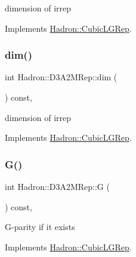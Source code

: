 dimension of irrep 

Implements \mbox{\hyperlink{structHadron_1_1CubicLGRep_a3acbaea26503ed64f20df693a48e4cdd}{Hadron\+::\+Cubic\+L\+G\+Rep}}.

\mbox{\label{structHadron_1_1D3A2MRep_ae911a1abb0e401263bce94ba89ac6142}} 
\subsubsection{\texorpdfstring{dim()}{dim()}\hspace{0.1cm}{\footnotesize\ttfamily [3/3]}}
{\footnotesize\ttfamily int Hadron\+::\+D3\+A2\+M\+Rep\+::dim (\begin{DoxyParamCaption}{ }\end{DoxyParamCaption}) const\hspace{0.3cm}{\ttfamily [inline]}, {\ttfamily [virtual]}}

dimension of irrep 

Implements \mbox{\hyperlink{structHadron_1_1CubicLGRep_a3acbaea26503ed64f20df693a48e4cdd}{Hadron\+::\+Cubic\+L\+G\+Rep}}.

\mbox{\label{structHadron_1_1D3A2MRep_aba5bc123585e4308b60da9a6a0077fea}} 
\subsubsection{\texorpdfstring{G()}{G()}\hspace{0.1cm}{\footnotesize\ttfamily [1/3]}}
{\footnotesize\ttfamily int Hadron\+::\+D3\+A2\+M\+Rep\+::G (\begin{DoxyParamCaption}{ }\end{DoxyParamCaption}) const\hspace{0.3cm}{\ttfamily [inline]}, {\ttfamily [virtual]}}

G-\/parity if it exists 

Implements \mbox{\hyperlink{structHadron_1_1CubicLGRep_ace26f7b2d55e3a668a14cb9026da5231}{Hadron\+::\+Cubic\+L\+G\+Rep}}.

\mbox{\label{structHadron_1_1D3A2MRep_aba5bc123585e4308b60da9a6a0077fea}} 
